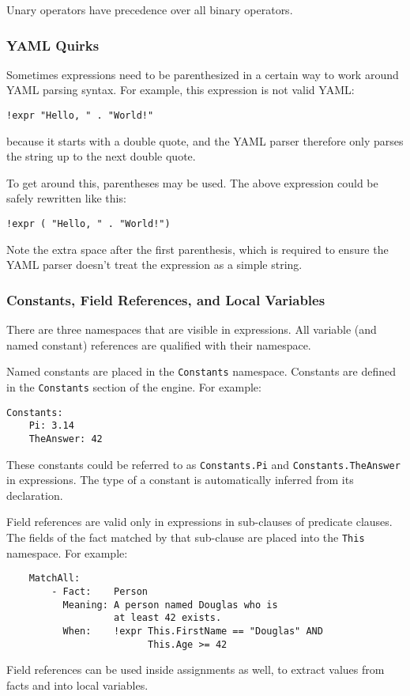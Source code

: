 \documentclass[letterpaper,10pt]{article}
\begin{document}
Unary operators have precedence over all binary operators.

\subsubsection{YAML Quirks}
Sometimes expressions need to be parenthesized in a certain way to work around YAML parsing syntax.
For example, this expression is not valid YAML:
\begin{lstlisting}[frame=none,numbers=none]
    !expr "Hello, " . "World!"
\end{lstlisting}
because it starts with a double quote, and the YAML parser therefore only parses the string up to the next double quote.

To get around this, parentheses may be used.
The above expression could be safely rewritten like this:
\begin{lstlisting}[frame=none,numbers=none]
    !expr ( "Hello, " . "World!")
\end{lstlisting}
Note the extra space after the first parenthesis, which is required to ensure the YAML parser doesn't treat the expression as a simple string.

\subsubsection{Constants, Field References, and Local Variables}
There are three namespaces that are visible in expressions.
All variable (and named constant) references are qualified with their namespace.

Named constants are placed in the \texttt{Constants} namespace.
Constants are defined in the \texttt{Constants} section of the engine.
For example:
\begin{lstlisting}
Constants:
    Pi: 3.14
    TheAnswer: 42
\end{lstlisting}
These constants could be referred to as \texttt{Constants.Pi} and \texttt{Constants.TheAnswer} in expressions.
The type of a constant is automatically inferred from its declaration.

Field references are valid only in expressions in sub-clauses of predicate clauses.
The fields of the fact matched by that sub-clause are placed into the \texttt{This} namespace.
For example:
\begin{lstlisting}
    MatchAll:
        - Fact:    Person
          Meaning: A person named Douglas who is
                   at least 42 exists.
          When:    !expr This.FirstName == "Douglas" AND
                         This.Age >= 42
\end{lstlisting}
Field references can be used inside assignments as well, to extract values from facts and into local variables.
\end{document}
